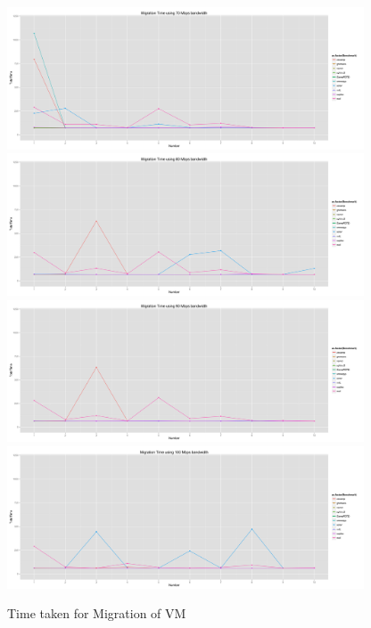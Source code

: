 \documentclass[a4paper,10pt,twoside]{article}
\begin{document}
\begin{figure}[h]
\centering
\includegraphics[width=400px]{migration_time70.png} \\ 
 \includegraphics[width=400px]{migration_time80.png}\\  
 \includegraphics[width=400px]{migration_time90.png} \\ 
\includegraphics[width=400px]{migration_time100.png}\\ 
\caption{Time taken for Migration of VM}
\end{figure}
\end{document}
